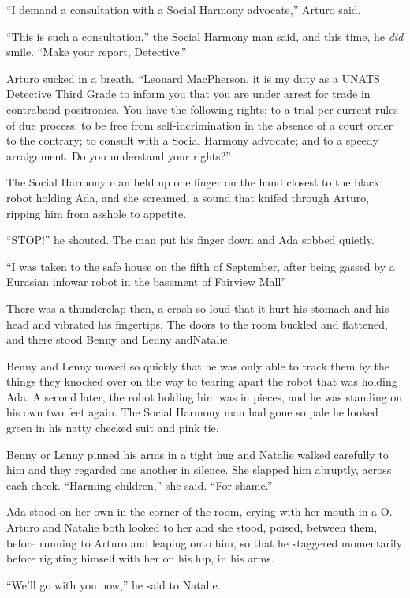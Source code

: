 “I demand a consultation with a Social Harmony advocate,” Arturo
said.

“This is such a consultation,” the Social Harmony man said, and
this time, he \emph{did} smile. “Make your report, Detective.”

Arturo sucked in a breath. “Leonard MacPherson, it is my duty as a
UNATS Detective Third Grade to inform you that you are under arrest
for trade in contraband positronics. You have the following rights:
to a trial per current rules of due process; to be free from
self-incrimination in the absence of a court order to the contrary;
to consult with a Social Harmony advocate; and to a speedy
arraignment. Do you understand your rights?”

The Social Harmony man held up one finger on the hand closest to
the black robot holding Ada, and she screamed, a sound that knifed
through Arturo, ripping him from asshole to appetite.

“STOP!” he shouted. The man put his finger down and Ada sobbed
quietly.

“I was taken to the safe house on the fifth of September, after
being gassed by a Eurasian infowar robot in the basement of
Fairview Mall{\dash}”

There was a thunderclap then, a crash so loud that it hurt his
stomach and his head and vibrated his fingertips. The doors to the
room buckled and flattened, and there stood Benny and Lenny
and{\dash}Natalie.

\tb

Benny and Lenny moved so quickly that he was only able to track
them by the things they knocked over on the way to tearing apart
the robot that was holding Ada. A second later, the robot holding
him was in pieces, and he was standing on his own two feet again.
The Social Harmony man had gone so pale he looked green in his
natty checked suit and pink tie.

Benny or Lenny pinned his arms in a tight hug and Natalie walked
carefully to him and they regarded one another in silence. She
slapped him abruptly, across each cheek. “Harming children,” she
said. “For shame.”

Ada stood on her own in the corner of the room, crying with her
mouth in a O. Arturo and Natalie both looked to her and she stood,
poised, between them, before running to Arturo and leaping onto
him, so that he staggered momentarily before righting himself with
her on his hip, in his arms.

“We’ll go with you now,” he said to Natalie.

